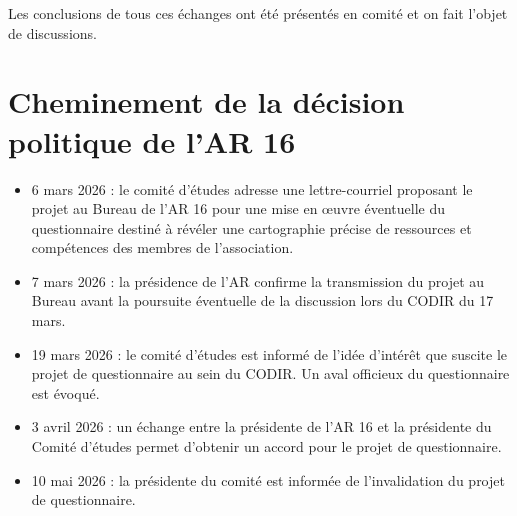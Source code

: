 \documentclass[10pt,a4paper]{article}
\begin{document}
Les conclusions de tous ces échanges ont été présentés en comité et on fait l'objet de discussions.

\section{Cheminement de la décision politique de l'AR 16}

\begin{itemize}
    \item 6 mars 2026 : le comité d'études adresse une lettre-courriel proposant le projet au Bureau de l'AR 16 pour une mise en œuvre éventuelle du questionnaire destiné à révéler une cartographie précise de ressources et compétences des membres de l'association.

    \item 7 mars 2026 : la présidence de l'AR confirme la transmission du projet au Bureau avant la poursuite éventuelle de la discussion lors du CODIR du 17 mars.

    \item 19 mars 2026 : le comité d'études est informé de l'idée d'intérêt que suscite le projet de questionnaire au sein du CODIR. Un aval officieux du questionnaire est évoqué.

    \item 3 avril 2026 : un échange entre la présidente de l'AR 16 et la présidente du Comité d'études permet d'obtenir un accord pour le projet de questionnaire.

    \item 10 mai 2026 : la présidente du comité est informée de l'invalidation du projet de questionnaire.
\end{itemize}
\end{document}
